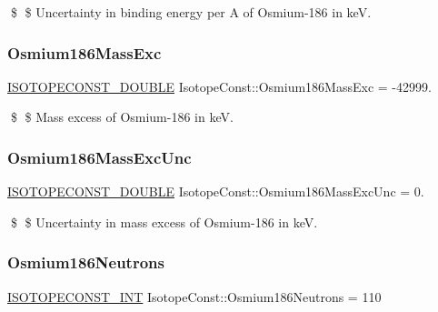 \$ \$ Uncertainty in binding energy per A of Osmium-\/186 in keV. \mbox{\label{group___isotope_const-_osmium-_os186_ga48947d1eb5778b1fb74d792e5d2ab0f7}} 
\subsubsection{\texorpdfstring{Osmium186\+Mass\+Exc}{Osmium186MassExc}}
{\footnotesize\ttfamily \mbox{\hyperlink{group___isotope_const-_macros_ga8f45a7272ce02c0b4c65c44636ed719a}{I\+S\+O\+T\+O\+P\+E\+C\+O\+N\+S\+T\+\_\+\+D\+O\+U\+B\+LE}} Isotope\+Const\+::\+Osmium186\+Mass\+Exc = -\/42999.}

\$ \$ Mass excess of Osmium-\/186 in keV. \mbox{\label{group___isotope_const-_osmium-_os186_gab35b87b7da33162491689ef164ca210e}} 
\subsubsection{\texorpdfstring{Osmium186\+Mass\+Exc\+Unc}{Osmium186MassExcUnc}}
{\footnotesize\ttfamily \mbox{\hyperlink{group___isotope_const-_macros_ga8f45a7272ce02c0b4c65c44636ed719a}{I\+S\+O\+T\+O\+P\+E\+C\+O\+N\+S\+T\+\_\+\+D\+O\+U\+B\+LE}} Isotope\+Const\+::\+Osmium186\+Mass\+Exc\+Unc = 0.}

\$ \$ Uncertainty in mass excess of Osmium-\/186 in keV. \mbox{\label{group___isotope_const-_osmium-_os186_ga42698151f056fd06c89287a5921083cd}} 
\subsubsection{\texorpdfstring{Osmium186\+Neutrons}{Osmium186Neutrons}}
{\footnotesize\ttfamily \mbox{\hyperlink{group___isotope_const-_macros_ga5f18360b3e99483a35c32d789e62621c}{I\+S\+O\+T\+O\+P\+E\+C\+O\+N\+S\+T\+\_\+\+I\+NT}} Isotope\+Const\+::\+Osmium186\+Neutrons = 110}


